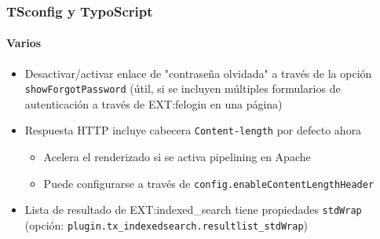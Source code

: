 %
%

\begin{frame}[fragile]
	\frametitle{TSconfig y TypoScript}
	\framesubtitle{Varios}

	\begin{itemize}

		\item Desactivar/activar enlace de "contraseña olvidada" a través de la opción \small\texttt{showForgotPassword}\normalsize\newline
			(útil, si se incluyen múltiples formularios de autenticación a través de EXT:felogin en una página)

		\item Respuesta HTTP incluye cabecera \texttt{Content-length} por defecto ahora

			\begin{itemize}
				\item Acelera el renderizado si se activa pipelining en Apache
				\item Puede configurarse a través de \texttt{config.enableContentLengthHeader}
			\end{itemize}

		\item Lista de resultado de EXT:indexed\_search tiene propiedades \texttt{stdWrap}\newline
			(opción: \texttt{plugin.tx\_indexedsearch.resultlist\_stdWrap})

	\end{itemize}

\end{frame}


